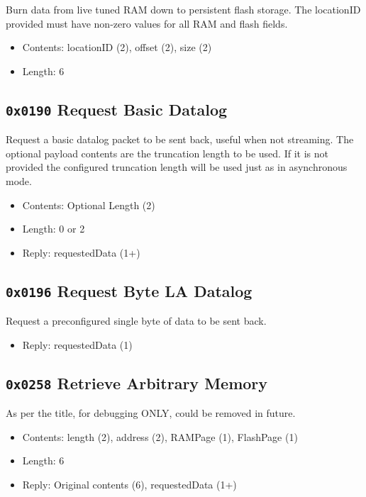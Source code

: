 \documentclass[12pt,a4paper,titlepage]{article}
\begin{document}
Burn data from live tuned RAM down to persistent flash storage. The locationID provided must have non-zero values for all RAM and flash fields.

\begin{itemize}
\item Contents: locationID (2),  offset (2), size (2)
\item Length: 6
\end{itemize}


\subsection{\texttt{0x0190} Request Basic Datalog}

Request a basic datalog packet to be sent back, useful when not streaming. The optional payload contents are the truncation length to be used. If it is not provided the configured truncation length will be used just as in asynchronous mode.

\begin{itemize}
\item Contents: Optional Length (2)
\item Length: 0 or 2
\item Reply: requestedData (1+)
\end{itemize}


\subsection{\texttt{0x0196} Request Byte LA Datalog}

Request a preconfigured single byte of data to be sent back.

\begin{itemize}
\item Reply: requestedData (1)
\end{itemize}


\subsection{\texttt{0x0258} Retrieve Arbitrary Memory}

As per the title, for debugging ONLY, could be removed in future.

\begin{itemize}
\item Contents: length (2), address (2), RAMPage (1), FlashPage (1)
\item Length: 6
\item Reply: Original contents (6), requestedData (1+)
\end{itemize}
\end{document}
